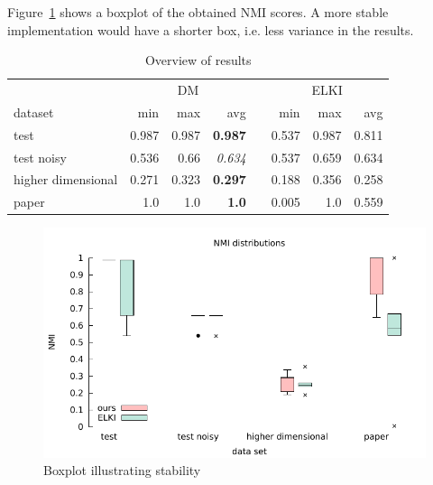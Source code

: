 \documentclass[english]{scrartcl}
\begin{document}
Figure~\ref{fig:box} shows a boxplot of the obtained NMI scores. A more stable implementation
would have a shorter box, i.e. less variance in the results.

\begin{table}[]\centering
  \begin{tabular}{lrrrcrrr}\toprule
     & \multicolumn{3}{c}{DM} & \phantom{abc} & \multicolumn{3}{c}{ELKI}\\
    dataset & min & max & avg & & min & max & avg\\ \midrule
    test & 0.987 & 0.987 & \textbf{0.987} & & 0.537 & 0.987 & 0.811\\
    test noisy & 0.536 & 0.66 & \emph{0.634} & & 0.537 & 0.659 & 0.634\\
    higher dimensional & 0.271 & 0.323 & \textbf{0.297} & & 0.188 & 0.356 & 0.258\\
    paper & 1.0 & 1.0 & \textbf{1.0} & & 0.005 & 1.0 & 0.559\\
  \bottomrule
  \end{tabular}
  \caption{Overview of results}
  \label{tab:overview}
\end{table}

\begin{figure}
    \centering
    \includegraphics[width=\textwidth]{img/boxplt}
    \caption{Boxplot illustrating stability}
    \label{fig:box}
\end{figure}
\end{document}
